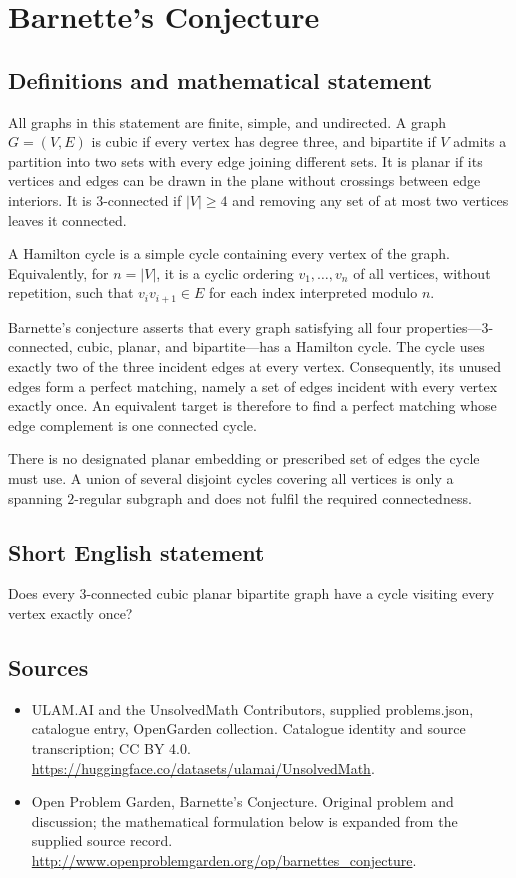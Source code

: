 \documentclass[11pt,a4paper]{article}
\begin{document}
\section*{Barnette's Conjecture}\label{statement}

\subsection{Definitions and mathematical statement}
All graphs in this statement are finite, simple, and undirected.
A graph $G=(V,E)$ is cubic if every vertex has degree three,
and bipartite if $V$ admits a partition into two sets with
every edge joining different sets. It is planar if its
vertices and edges can be drawn in the plane without crossings
between edge interiors. It is $3$-connected if $|V|\geq4$ and
removing any set of at most two vertices leaves it connected.

A Hamilton cycle is a simple cycle containing every vertex
of the graph. Equivalently, for $n=|V|$, it is a cyclic
ordering $v_1,\ldots,v_n$ of all vertices, without repetition,
such that $v_iv_{i+1}\in E$ for each index interpreted modulo
$n$.

Barnette's conjecture asserts that every graph satisfying
all four properties---$3$-connected, cubic, planar, and
bipartite---has a Hamilton cycle. The cycle uses exactly two
of the three incident edges at every vertex. Consequently,
its unused edges form a perfect matching, namely a set of
edges incident with every vertex exactly once. An equivalent
target is therefore to find a perfect matching whose edge
complement is one connected cycle.

There is no designated planar embedding or prescribed set
of edges the cycle must use. A union of several disjoint
cycles covering all vertices is only a spanning $2$-regular
subgraph and does not fulfil the required connectedness.
\subsection{Short English statement}
Does every 3-connected cubic planar bipartite graph have a cycle visiting every vertex exactly once?
\subsection{Sources}
\begin{itemize}
\item[S1] ULAM.AI and the UnsolvedMath Contributors, supplied problems.json, catalogue entry, OpenGarden collection. Catalogue identity and source transcription; CC BY 4.0.
\url{https://huggingface.co/datasets/ulamai/UnsolvedMath}.
\item[S2] Open Problem Garden, Barnette's Conjecture. Original problem and discussion; the mathematical formulation below is expanded from the supplied source record.
\url{http://www.openproblemgarden.org/op/barnettes_conjecture}.
\end{itemize}
\end{document}
